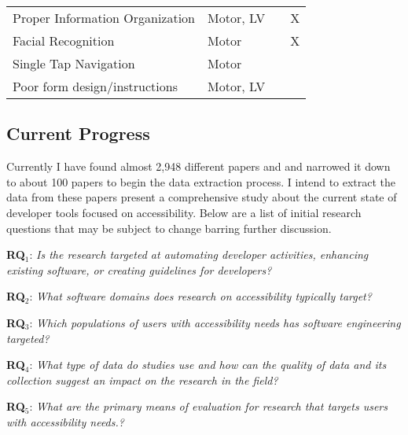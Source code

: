 \begin{table}[h]
\begin{tabular}{>{\centering\arraybackslash}p{2in}|>{\centering\arraybackslash}p{1.8in}|>{\centering\arraybackslash}p{.82in}|>{\centering\arraybackslash}p{.82in}}
		 Proper Information Organization & \footnotesize {Motor, LV} & \cite{Calvo16} & X \\
		\rowcolor{gray!30!} Facial Recognition & \footnotesize {Motor} & \cite{Calvo16, Astler11} & X \\
		 Single Tap Navigation & \footnotesize {Motor} & \cite{AppleAccess, GoogleAccess, HarvardAccess, WebGuide, FlrezAristizbal19, Milne18} &  \\
		\rowcolor{gray!30!} Poor form design/instructions & \footnotesize {Motor, LV} & \cite{ADAWeb, AccessGov} &  
		\end{tabular}
\vspace{-1em}
	\label{tab:guidelines}
\end{table}

\subsection{Current Progress}

Currently I have found almost 2,948 different papers and and narrowed it down to about 100 papers to begin the data extraction process. I intend to extract the data from these papers present a comprehensive study about the current state of developer tools focused on accessibility. Below are a list of initial research questions that may be subject to change barring further discussion. 



\begin{description}
  
    \item \textbf{RQ$_1$}: \textit{Is the research targeted at automating developer activities, enhancing existing software, or creating guidelines for developers?}
    \item \textbf{RQ$_2$}: \textit{What software domains does research on accessibility typically target?}
    \item \textbf{RQ$_3$}: \textit{Which populations of users with accessibility needs has software engineering targeted?}
    \item \textbf{RQ$_4$}: \textit{What type of data do studies use and how can the quality of data and its collection suggest an impact on the research in the field?}
    \item \textbf{RQ$_5$}: \textit{What are the primary means of evaluation for research that targets users with accessibility needs.?}

 \end{description}


